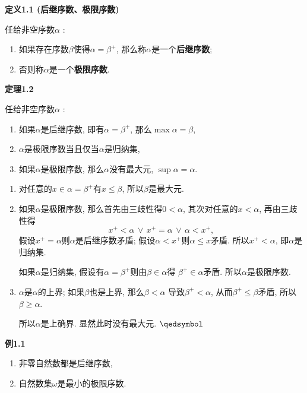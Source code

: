 \documentclass[UTF8]{ctexart}
\begin{document}
\hypertarget{sec:定义1.1}{}
\noindent\textbf{定义1.1 (后继序数、极限序数)}

任给非空序数$\alpha$ :
\begin{enumerate}
    \item 如果存在序数$\beta$使得$\alpha=\beta^+$,
    那么称$\alpha$是一个\textbf{后继序数};
    \item 否则称$\alpha$是一个\textbf{极限序数}.
\end{enumerate}

\vspace{10pt}

\hypertarget{sec:定理1.2}{}
\noindent\textbf{定理1.2}

任给非空序数$\alpha$ :
\begin{enumerate}
    \item 如果$\alpha$是后继序数, 即有$\alpha=\beta^+$, 那么$\max\alpha=\beta$,
    \item $\alpha$是极限序数当且仅当$\alpha$是归纳集,
    \item 如果$\alpha$是极限序数, 那么$\alpha$没有最大元, $\sup\alpha=\alpha$.
\end{enumerate}


\begin{enumerate}
    \item 对任意的$x\in\alpha=\beta^+$有$x\leqslant\beta$, 所以$\beta$是最大元.
    
    \item 如果$\alpha$是极限序数, 那么首先由三歧性得$0<\alpha$,
    其次对任意的$x<\alpha$, 再由三歧性得
    \[
        x^+<\alpha\,\lor\,x^+=\alpha\,\lor\,\alpha<x^+,
    \]
    假设$x^+=\alpha$则$\alpha$是后继序数矛盾;
    假设$\alpha<x^+$则$\alpha\leqslant x$矛盾.
    所以$x^+<\alpha$, 即$\alpha$是归纳集.

    \hspace{2.17em}
    如果$\alpha$是归纳集, 假设有$\alpha=\beta^+$则由$\beta\in\alpha$得
    $\beta^+\in\alpha$矛盾. 所以$\alpha$是极限序数.

    \item $\alpha$是$\alpha$的上界; 如果$\beta$也是上界, 那么$\beta<\alpha$
    导致$\beta^+<\alpha$, 从而$\beta^+\leqslant\beta$矛盾,
    所以$\beta\geqslant\alpha$.
    
    \hspace{2.17em}
    所以$\alpha$是上确界. 显然此时没有最大元. \hfill $\qedsymbol$
\end{enumerate}

\vspace{10pt}

\hypertarget{sec:例1.1}{}
\noindent\textbf{例1.1}

\begin{enumerate}
    \item 非零自然数都是后继序数,
    \item 自然数集$\omega$是最小的极限序数.
\end{enumerate}
\end{document}
